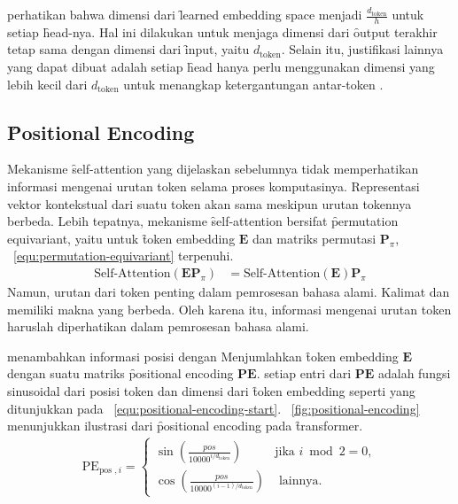	perhatikan bahwa dimensi dari \f{learned embedding space} menjadi $\frac{d_{\text{token}}}{h}$ untuk setiap \f{head}-nya. Hal ini dilakukan untuk menjaga dimensi dari \f{output} terakhir tetap sama dengan dimensi dari \f{input}, yaitu $d_{\text{token}}$. Selain itu, justifikasi lainnya yang dapat dibuat adalah setiap \f{head} hanya perlu menggunakan dimensi yang lebih kecil dari $d_{\text{token}}$ untuk menangkap ketergantungan antar-token \citep{pi-tau2023transformer}.

	\subsection{\f{Positional Encoding}}
	\label{sec:positional-encoding}
	Mekanisme \f{self-attention} yang dijelaskan sebelumnya tidak memperhatikan informasi mengenai urutan token selama proses komputasinya. Representasi vektor kontekstual dari suatu token akan sama meskipun urutan tokennya berbeda. Lebih tepatnya, mekanisme \f{self-attention} bersifat \f{permutation equivariant}, yaitu untuk \f{token embedding} $\mathbf{E}$ dan matriks permutasi $\mathbf{P}_{\pi}$, \equ~\ref{equ:permutation-equivariant} terpenuhi.
	\begin{align}
	\label{equ:permutation-equivariant}
	\text{Self-Attention}(\mathbf{EP}_{\pi}) &= \text{Self-Attention}(\mathbf{E})\mathbf{P}_{\pi}
	\end{align}
	Namun, urutan dari token penting dalam pemrosesan bahasa alami. Kalimat  dan  memiliki makna yang berbeda. Oleh karena itu, informasi mengenai urutan token haruslah diperhatikan dalam pemrosesan bahasa alami.
	
	\cite{transformerori} menambahkan informasi posisi dengan Menjumlahkan \f{token embedding} $\mathbf{E}$ dengan suatu matriks \f{positional encoding} $\mathbf{PE}$. setiap entri dari $\mathbf{PE}$ adalah fungsi sinusoidal dari posisi token  dan dimensi dari \f{token embedding} seperti yang ditunjukkan pada \equ~\ref{equ:positional-encoding-start}. \pic~\ref{fig:positional-encoding} menunjukkan ilustrasi dari \f{positional encoding} pada \f{transformer}.
	\begin{align}
		\label{equ:positional-encoding-start}
		\text{PE}_{ \text {pos }, i}= \begin{cases}\sin \left(\frac{p o s}{10000^{i / d_{\text {token}}}}\right) & \text {jika } i \bmod 2=0 ,\\ \cos \left(\frac{p o s}{10000^{(i-1) / d_{\text {token}}}}\right) & \text { lainnya. }\end{cases}
	\end{align}

